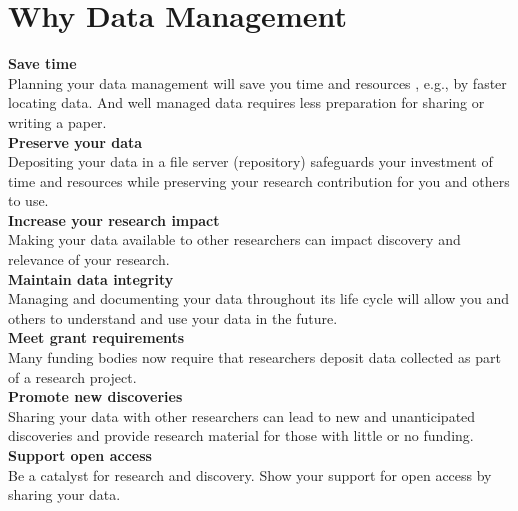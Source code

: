 \section{Why Data Management}

\textbf{Save time} \\
Planning your data management will save you time and resources \cite{martinez-garcia:2023:Heliyon}, e.g., by faster locating data. And well managed data requires less preparation for sharing or writing a paper. \\[6pt]
\textbf{Preserve your data} \\
Depositing your data in a file server (repository) safeguards your investment of time and resources while preserving your research contribution for you and others to use. \\[6pt]
\textbf{Increase your research impact} \\
Making your data available to other researchers can impact discovery and relevance of your research. \\[6pt]
\textbf{Maintain data integrity} \\
Managing and documenting your data throughout its life cycle will allow you and others to understand and use your data in the future. \\[6pt]
\textbf{Meet grant requirements} \\
Many funding bodies now require that researchers deposit data collected as part of a research project. \\[6pt]
\textbf{Promote new discoveries} \\
Sharing your data with other researchers can lead to new and unanticipated discoveries and provide research material for those with little or no funding. \\[6pt]
\textbf{Support open access} \\
Be a catalyst for research and discovery. Show your support for open access by sharing your data.
